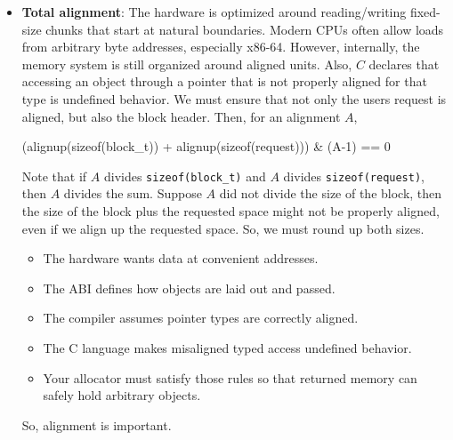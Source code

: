 \documentclass{report}
\begin{document}
\begin{itemize}
\begin{cppcode}
                static size_t align_up(size_t n) {
                    return (n + ALIGNMENT - 1) & ~(ALIGNMENT - 1);
                }
                \end{cppcode}
                \bigbreak \noindent 
                This assumes ALIGNMENT is a power of two, which it normally is for C object alignments.
            \item \textbf{Total alignment}: The hardware is optimized around reading/writing fixed-size chunks that start at natural boundaries.
                \bigbreak \noindent 
                Modern CPUs often allow loads from arbitrary byte addresses, especially x86-64. However, internally, the memory system is still organized around aligned units.
                \bigbreak \noindent 
                Also, $C$ declares that accessing an object through a pointer that is not properly aligned for that type is undefined behavior.
                \bigbreak \noindent 
                We must ensure that not only the users request is aligned, but also the block header. Then, for an alignment $A$,
                \bigbreak \noindent 
                \begin{cppcode}
                    (alignup(sizeof(block_t)) + alignup(sizeof(request))) & (A-1) == 0
                \end{cppcode}
                \bigbreak \noindent 
                Note that if $A$ divides \texttt{sizeof(block\_t)} and $A$ divides \texttt{sizeof(request)}, then $A$ divides the sum.
                \bigbreak \noindent 
                Suppose $A$ did not divide the size of the block, then the size of the block plus the requested space might not be properly aligned, even if we align up the requested space. So, we must round up both sizes.
                \begin{itemize}
                    \item The hardware wants data at convenient addresses.
                    \item The ABI defines how objects are laid out and passed.
                    \item The compiler assumes pointer types are correctly aligned.
                    \item The C language makes misaligned typed access undefined behavior.
                    \item Your allocator must satisfy those rules so that returned memory can safely hold arbitrary objects.
                \end{itemize}
                So, alignment is important.

\end{itemize}
\end{document}
